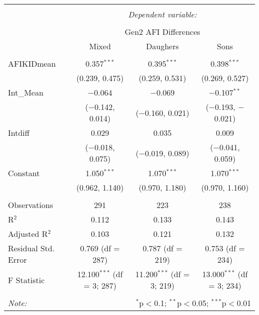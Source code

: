 
\begingroup 
\small 
\begin{tabular}{@{\extracolsep{1pt}}lccc} 
\\[-1.8ex]\hline 
\hline \\[-1.8ex] 
 & \multicolumn{3}{c}{\textit{Dependent variable:}} \\ 
\cline{2-4} 
\\[-1.8ex] & \multicolumn{3}{c}{Gen2 AFI Differences} \\ 
 & Mixed & Daughers & Sons \\ 
\hline \\[-1.8ex] 
 AFIKIDmean & 0.357$^{***}$ & 0.395$^{***}$ & 0.398$^{***}$ \\ 
  & (0.239, 0.475) & (0.259, 0.531) & (0.269, 0.527) \\ 
  Int\_Mean & $-$0.064 & $-$0.069 & $-$0.107$^{**}$ \\ 
  & ($-$0.142, 0.014) & ($-$0.160, 0.021) & ($-$0.193, $-$0.021) \\ 
  Intdiff & 0.029 & 0.035 & 0.009 \\ 
  & ($-$0.018, 0.075) & ($-$0.019, 0.089) & ($-$0.041, 0.059) \\ 
  Constant & 1.050$^{***}$ & 1.070$^{***}$ & 1.070$^{***}$ \\ 
  & (0.962, 1.140) & (0.970, 1.180) & (0.970, 1.160) \\ 
 \hline \\[-1.8ex] 
Observations & 291 & 223 & 238 \\ 
R$^{2}$ & 0.112 & 0.133 & 0.143 \\ 
Adjusted R$^{2}$ & 0.103 & 0.121 & 0.132 \\ 
Residual Std. Error & 0.769 (df = 287) & 0.787 (df = 219) & 0.753 (df = 234) \\ 
F Statistic & 12.100$^{***}$ (df = 3; 287) & 11.200$^{***}$ (df = 3; 219) & 13.000$^{***}$ (df = 3; 234) \\ 
\hline 
\hline \\[-1.8ex] 
\textit{Note:}  & \multicolumn{3}{r}{$^{*}$p$<$0.1; $^{**}$p$<$0.05; $^{***}$p$<$0.01} \\ 
\end{tabular} 
\endgroup 
